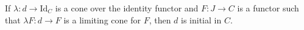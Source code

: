 If $\lambda: d \to \mathrm{Id}_C$ is a cone over the identity functor and $F: J \to C$ is a functor such that $\lambda F: d \to F$ is a limiting cone for $F$, then $d$ is initial in $C$.
